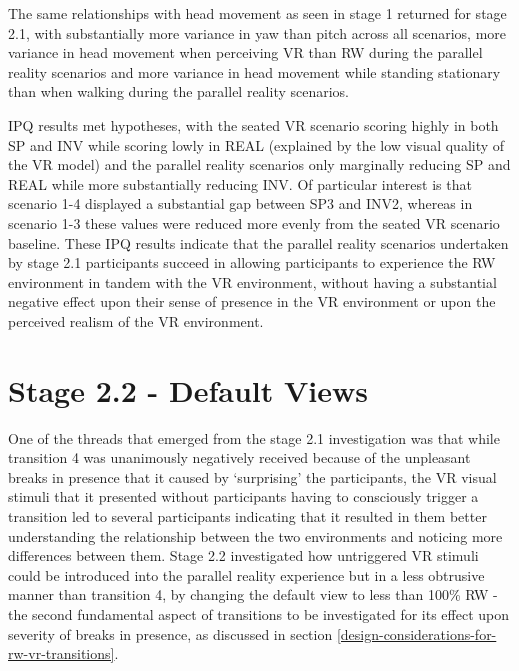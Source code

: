 The same relationships with head movement as seen in stage 1 returned for stage 2.1, with substantially more variance in yaw than pitch across all scenarios, more variance in head movement when perceiving VR than RW during the parallel reality scenarios and more variance in head movement while standing stationary than when walking during the parallel reality scenarios.

IPQ results met hypotheses, with the seated VR scenario scoring highly in both SP and INV while scoring lowly in REAL (explained by the low visual quality of the VR model) and the parallel reality scenarios only marginally reducing SP and REAL while more substantially reducing INV. Of particular interest is that scenario 1-4 displayed a substantial gap between SP3 and INV2, whereas in scenario 1-3 these values were reduced more evenly from the seated VR scenario baseline. These IPQ results indicate that the parallel reality scenarios undertaken by stage 2.1 participants succeed in allowing participants to experience the RW environment in tandem with the VR environment, without having a substantial negative effect upon their sense of presence in the VR environment or upon the perceived realism of the VR environment.


\clearpage


\section{Stage 2.2 - Default Views}

One of the threads that emerged from the stage 2.1 investigation was that while transition 4 was unanimously negatively received because of the unpleasant breaks in presence that it caused by `surprising' the participants, the VR visual stimuli that it presented without participants having to consciously trigger a transition led to several participants indicating that it resulted in them better understanding the relationship between the two environments and noticing more differences between them. Stage 2.2 investigated how untriggered VR stimuli could be introduced into the parallel reality experience but in a less obtrusive manner than transition 4, by changing the default view to less than 100\% RW - the second fundamental aspect of transitions to be investigated for its effect upon severity of breaks in presence, as discussed in section \ref{design-considerations-for-rw-vr-transitions}.

